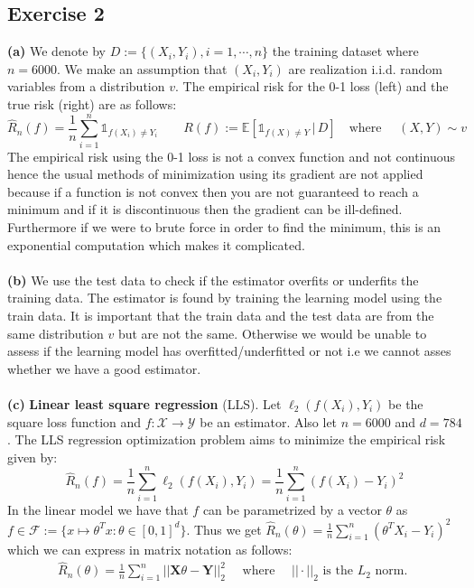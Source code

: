 \documentclass[10pt,a4paper]{article}
\begin{document}
\subsection*{Exercise 2}
\textbf{(a)} 
We denote by $D := \{(X_i, Y_i), i = 1, \cdots , n\}$  the training dataset where $n = 6000$. We make an assumption that $(X_i,Y_i)$ are realization i.i.d. random variables from a distribution $v$. The empirical risk for the 0-1 loss (left) and the true risk (right) are as follows:
$$
\hat{R}_n(f) = \frac{1}{n}\sum^n_{i=1} \mathds{1}_{f(X_i) \neq Y_i} \quad \quad  R(f):= \mathbb{E}[\mathds{1}_{f(X)\neq Y}\, | \, D] \quad \text{where } \quad (X,Y) \sim v$$
The empirical risk using the 0-1 loss is not a convex function and not continuous hence the usual methods of minimization using its gradient are not applied because if a function is not convex then you are not guaranteed to reach a minimum and if it is discontinuous then the gradient can be ill-defined. Furthermore if we were to brute force in order to find the minimum, this is an exponential computation which makes it complicated. \\\\
\textbf{(b)} We use the test data to check if the estimator overfits or underfits the training data. The estimator is found by training the learning model using the train data. It is important that the train data and the test data are from the same distribution $v$ but are not the same. Otherwise we would be unable to assess if the learning model has overfitted/underfitted or not i.e we cannot asses whether we have a good estimator. \\\\
\textbf{(c) }\textbf{ Linear least square regression} (LLS). Let $\ell_2(f(X_i), Y_i)$ be the square loss function  and $f:\mathcal{X} \rightarrow \mathcal{Y}$ be an estimator. Also let $n = 6000$ and $d = 784$. The LLS regression optimization problem aims to minimize the empirical risk  given by: 
$$ \hat{R}_n(f) = \frac{1}{n}\sum_{i=1}^n \ell_2(f(X_i),Y_i ) =  \frac{1}{n}\sum_{i=1}^n (f(X_i) - Y_i )^2$$
In the linear model we have that $f$ can be parametrized by a vector $\theta$ as  $f \in \mathcal{F} := \{x \mapsto \theta^Tx : \theta \in [0,1]^{d} \}$. Thus we get $\hat{R}_n(\theta) = \frac{1}{n}\sum_{i=1}^n (\theta^T X_i - Y_i )^2$ which we can express in matrix notation as follows: 
\begin{align*} \hat{R}_n(\theta) = \frac{1}{n}\sum_{i=1}^n  ||\mathbf{X}\theta - \mathbf{Y}||_2^2  \quad \text{ where } \quad ||\cdot ||_2 \text{ is the } L_2 \text{ norm. }
\end{align*}
\end{document}
